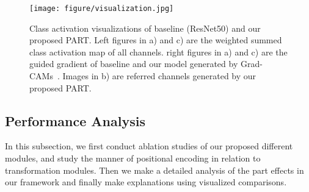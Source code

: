 \documentclass[journal]{IEEEtran}
\begin{document}
\begin{figure*}
\begin{center}
\texttt{[image: figure/visualization.jpg]}
 \caption{Class activation visualizations of baseline (ResNet50) and our proposed PART. Left figures in a) and c) are the weighted summed class activation map of all channels. right figures in a) and c) are the guided gradient of baseline and our model generated by Grad-CAMs~\cite{selvaraju2017grad}. Images in b) are referred channels generated by our proposed PART.}
 \label{fig:experiment}
 \end{center}
\end{figure*}


\subsection{Performance Analysis}\label{sec:expperformance}

In this subsection, we first conduct ablation studies of our proposed different modules, and study the manner of positional encoding in relation to transformation modules. Then we make a detailed analysis of the part effects in our framework and finally make explanations using visualized comparisons.


\begin{table}[t]
\end{table}
\end{document}
